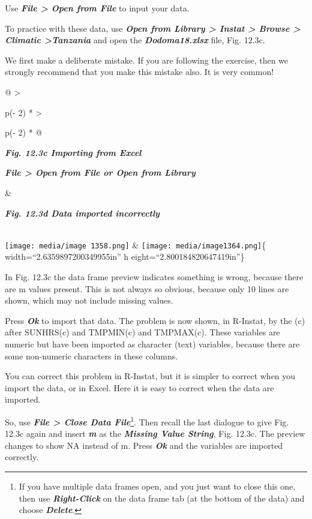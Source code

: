 \documentclass[
  letterpaper,
  DIV=11,
  numbers=noendperiod]{scrreprt}
\begin{document}
Use \textbf{\emph{File \textgreater{} Open from File}} to input your
data.

To practice with these data, use \textbf{\emph{Open from Library
\textgreater{} Instat \textgreater{} Browse \textgreater{} Climatic
\textgreater Tanzania}} and open the \textbf{\emph{Dodoma18.xlsx}} file,
Fig. 12.3c.

We first make a deliberate mistake. If you are following the exercise,
then we strongly recommend that you make this mistake also. It is very
common!

\begin{longtable}[]{@{}
  >{\raggedright\arraybackslash}p{(\columnwidth - 2\tabcolsep) * }
  >{\raggedright\arraybackslash}p{(\columnwidth - 2\tabcolsep) * }@{}}
\toprule\noalign{}
\begin{minipage}[b]{\linewidth}\raggedright
\textbf{\emph{Fig. 12.3c Importing from Excel}}

\textbf{\emph{File \textgreater{} Open from File or Open from Library}}
\end{minipage} & \begin{minipage}[b]{\linewidth}\raggedright
\textbf{\emph{Fig. 12.3d Data imported incorrectly}}
\end{minipage} \\
\midrule\noalign{}
\endhead
\bottomrule\noalign{}
\endlastfoot
\texttt{[image: media/image 1358.png]}
& \texttt{[image: media/image1364.png]}\{ width=``2.6359897200349955in''
h eight=``2.800184820647419in''\} \\
\end{longtable}

In Fig. 12.3c the data frame preview indicates something is wrong,
because there are m values present. This is not always so obvious,
because only 10 lines are shown, which may not include missing values.

Press \textbf{\emph{Ok}} to import that data. The problem is now shown,
in R-Instat, by the (c) after SUNHRS(c) and TMPMIN(c) and TMPMAX(c).
These variables are numeric but have been imported as character (text)
variables, because there are some non-numeric characters in these
columns.

You can correct this problem in R-Instat, but it is simpler to correct
when you import the data, or in Excel. Here it is easy to correct when
the data are imported.

So, use \textbf{\emph{File \textgreater{} Close Data File}}\footnote{If
  you have multiple data frames open, and you just want to close this
  one, then use \textbf{\emph{Right-Click}} on the data frame tab (at
  the bottom of the data) and choose \textbf{\emph{Delete}}.}. Then
recall the last dialogue to give Fig. 12.3c again and insert
\textbf{\emph{m}} as the \textbf{\emph{Missing Value String}}, Fig.
12.3c. The preview changes to show NA instead of m. Press
\textbf{\emph{Ok}} and the variables are imported correctly.
\end{document}

